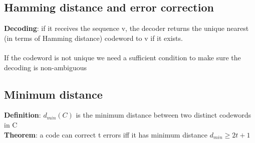 \documentclass{article}[18pt]
\begin{document}
\subsection{Hamming distance and error correction}
\textbf{Decoding}: if it receives the sequence v, the decoder returns the unique nearest (in terms of Hamming distance) codeword to v if it exists.\\
\\
If the codeword is not unique we need a sufficient condition to make sure the decoding is non-ambiguous 
\subsection{Minimum distance}
\textbf{Definition}: $d_{min}(C)$ is the minimum distance between two distinct codewords in C\\
\textbf{Theorem}: a code can correct t errors iff it has minimum distance $d_{min}\geqslant 2t+1$
\end{document}
